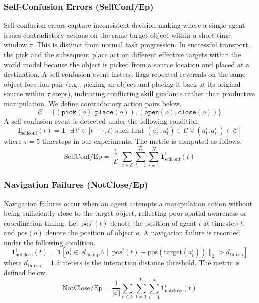 \documentclass{article}
\theoremstyle{plain}
\theoremstyle{definition}
\theoremstyle{remark}
\begin{document}
\subsubsection{Self-Confusion Errors (SelfConf/Ep)}

Self-confusion errors capture inconsistent decision-making where a single agent issues contradictory actions on the same target object within a short time window $\tau$. This is distinct from normal task progression. In successful transport, the pick and the subsequent place act on different effective targets within the world model because the object is picked from a source location and placed at a destination. A self-confusion event instead flags repeated reversals on the same object-location pair (e.g., picking an object and placing it back at its original source within $\tau$ steps), indicating conflicting skill guidance rather than productive manipulation. We define contradictory action pairs below.
\begin{equation}
    \mathcal{C} = \{(\texttt{pick}(o), \texttt{place}(o)), (\texttt{open}(o), \texttt{close}(o))\}
\end{equation}
A self-confusion event is detected under the following condition.
\begin{equation}
    \mathbf{1}_{\text{selfconf}}^i(t) = \mathbf{1}\left[ \exists\, t' \in [t-\tau, t) \text{ such that } (a_{t'}^i, a_t^i) \in \mathcal{C} \lor (a_t^i, a_{t'}^i) \in \mathcal{C} \right]
\end{equation}
where $\tau = 5$ timesteps in our experiments. The metric is computed as follows.
\begin{equation}
    \text{SelfConf/Ep} = \frac{1}{|\mathcal{E}|} \sum_{e \in \mathcal{E}} \sum_{t=1}^{T_e} \sum_{i=1}^{N} \mathbf{1}_{\text{selfconf}}^i(t)
\end{equation}

\subsubsection{Navigation Failures (NotClose/Ep)}

Navigation failures occur when an agent attempts a manipulation action without being sufficiently close to the target object, reflecting poor spatial awareness or coordination timing. Let $\text{pos}^i(t)$ denote the position of agent $i$ at timestep $t$, and $\text{pos}(o)$ denote the position of object $o$. A navigation failure is recorded under the following condition.
\begin{equation}
    \mathbf{1}_{\text{notclose}}^i(t) = \mathbf{1}\left[ a_t^i \in \mathcal{A}_{\text{manip}} \land \|\text{pos}^i(t) - \text{pos}(\text{target}(a_t^i))\|_2 > d_{\text{thresh}} \right]
\end{equation}
where $d_{\text{thresh}} = 1.5$ meters is the interaction distance threshold. The metric is defined below.
\begin{equation}
    \text{NotClose/Ep} = \frac{1}{|\mathcal{E}|} \sum_{e \in \mathcal{E}} \sum_{t=1}^{T_e} \sum_{i=1}^{N} \mathbf{1}_{\text{notclose}}^i(t)
\end{equation}
\end{document}
